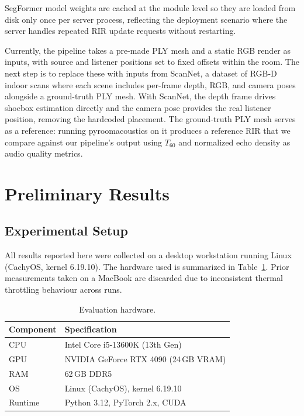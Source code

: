 \documentclass[11pt]{article}
\begin{document}
SegFormer model weights are cached at the module level so they are loaded from
disk only once per server process, reflecting the deployment scenario where the
server handles repeated RIR update requests without restarting.

Currently, the pipeline takes a pre-made PLY mesh and a static RGB render as
inputs, with source and listener positions set to fixed offsets within the room.
The next step is to replace these with inputs from ScanNet, a dataset of
RGB-D indoor scans where each scene includes per-frame depth, RGB, and camera
poses alongside a ground-truth PLY mesh. With ScanNet, the depth frame drives
shoebox estimation directly and the camera pose provides the real listener
position, removing the hardcoded placement. The ground-truth PLY mesh serves
as a reference: running pyroomacoustics on it produces a reference RIR that
we compare against our pipeline's output using $T_{60}$ and normalized echo
density as audio quality metrics.

\section{Preliminary Results}

\subsection{Experimental Setup}

All results reported here were collected on a desktop workstation running
Linux (CachyOS, kernel 6.19.10). The hardware used is summarized in
Table~\ref{tab:hardware}. Prior measurements taken on a MacBook are
discarded due to inconsistent thermal throttling behaviour across runs.

\begin{table}[H]
\small\centering
\caption{Evaluation hardware.}
\label{tab:hardware}
\begin{tabular}{@{}ll@{}}
\toprule
\textbf{Component} & \textbf{Specification}\\
\midrule
CPU  & Intel Core i5-13600K (13th Gen)\\
GPU  & NVIDIA GeForce RTX 4090 (24\,GB VRAM)\\
RAM  & 62\,GB DDR5\\
OS   & Linux (CachyOS), kernel 6.19.10\\
Runtime & Python 3.12, PyTorch 2.x, CUDA\\
\bottomrule
\end{tabular}
\end{table}
\end{document}
